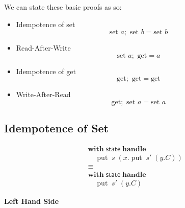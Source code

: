 \documentclass[logo,bsc,singlespacing,parskip]{infthesis}
\begin{document}
We can state these basic proofs as so:
\begin{itemize}
    \item Idempotence of set
    \[
    \text{set } a; \text{ set } b = \text{set } b
    \]
    
    \item Read-After-Write 
    \[
    \text{set } a; \text{ get} = a
    \]
    
    \item Idempotence of get
    \[
    \text{get}; \text{ get} = \text{get}
    \]
    
    \item Write-After-Read 
    \[
    \text{get}; \text{ set } a = \text{set } a
    \]
\end{itemize}

\subsection*{Idempotence of Set}

\[
\begin{aligned}
    &\mathsf{\textbf{with}} \; \mathsf{state} \; \mathsf{\textbf{handle}} \\
    &\quad \operatorname{put} \; s \; (x. \operatorname{put} \; s' \; (y. C)) \\
    &\equiv \\
    &\mathsf{\textbf{with}} \; \mathsf{state} \; \mathsf{\textbf{handle}} \\
    &\quad \operatorname{put} \; s' \; (y. C)
\end{aligned}
\]

\textbf{Left Hand Side}
\end{document}
